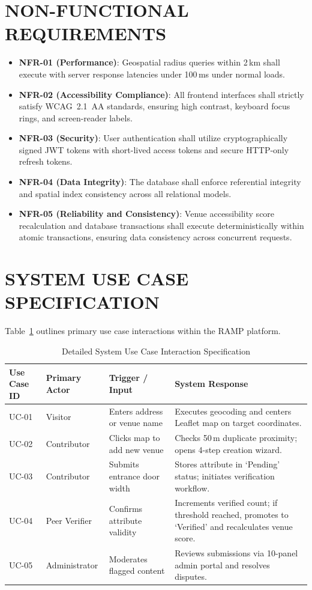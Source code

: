 \documentclass[12pt,a4paper]{report}
\begin{document}
\section{NON-FUNCTIONAL REQUIREMENTS}
\begin{itemize}
    \item \textbf{NFR-01 (Performance)}: Geospatial radius queries within 2\,km shall execute with server response latencies under 100\,ms under normal loads.
    \item \textbf{NFR-02 (Accessibility Compliance)}: All frontend interfaces shall strictly satisfy WCAG~2.1~AA standards, ensuring high contrast, keyboard focus rings, and screen-reader labels.
    \item \textbf{NFR-03 (Security)}: User authentication shall utilize cryptographically signed JWT tokens with short-lived access tokens and secure HTTP-only refresh tokens.
    \item \textbf{NFR-04 (Data Integrity)}: The database shall enforce referential integrity and spatial index consistency across all relational models.
    \item \textbf{NFR-05 (Reliability and Consistency)}: Venue accessibility score recalculation and database transactions shall execute deterministically within atomic transactions, ensuring data consistency across concurrent requests.
\end{itemize}

\section{SYSTEM USE CASE SPECIFICATION}
Table~\ref{tab:use_case_specs} outlines primary use case interactions within the RAMP platform.

\begin{table}[htbp]
\centering
\caption{Detailed System Use Case Interaction Specification}
\label{tab:use_case_specs}
\small
\begin{tabularx}{\textwidth}{p{2.8cm}p{3cm}p{4cm}X}
\toprule
\textbf{Use Case ID} & \textbf{Primary Actor} & \textbf{Trigger / Input} & \textbf{System Response} \\
\midrule
UC-01 & Visitor & Enters address or venue name & Executes geocoding and centers Leaflet map on target coordinates. \\
\addlinespace
UC-02 & Contributor & Clicks map to add new venue & Checks 50\,m duplicate proximity; opens 4-step creation wizard. \\
\addlinespace
UC-03 & Contributor & Submits entrance door width & Stores attribute in `Pending' status; initiates verification workflow. \\
\addlinespace
UC-04 & Peer Verifier & Confirms attribute validity & Increments verified count; if threshold reached, promotes to `Verified' and recalculates venue score. \\
\addlinespace
UC-05 & Administrator & Moderates flagged content & Reviews submissions via 10-panel admin portal and resolves disputes. \\
\bottomrule
\end{tabularx}
\end{table}
\end{document}
